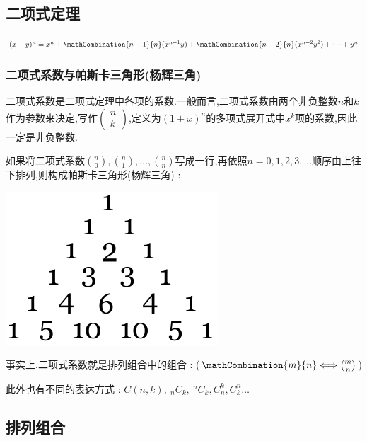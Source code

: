 {\subsection{二项式定理}{
    $(x + y)^n = x^n + \mathCombination{n - 1}{n}(x^{n-1} y) + \mathCombination{n - 2}{n}(x^{n-2} y^2) + \dots + y^n$

    \subsubsection{二项式系数与帕斯卡三角形(杨辉三角)}{

        二项式系数是二项式定理中各项的系数.一般而言,二项式系数由两个非负整数$n$和$k$作为参数来决定,写作$\begin{pmatrix}
                n \\
                k
            \end{pmatrix}$,定义为$(1 + x)^n$的多项式展开式中$x^k$项的系数,因此一定是非负整数.

        如果将二项式系数$\binom{n}{0},\binom{n}{1},\dots,\binom{n}{n}$写成一行,再依照$n = 0,1,2,3,...$顺序由上往下排列,则构成帕斯卡三角形(杨辉三角) :
        \begin{center}
            \includegraphics[scale=0.5]{resources/Pascal's_triangle_5.svg.png}
        \end{center}

        事实上,二项式系数就是排列组合中的组合 : ($\mathCombination{m}{n} \Longleftrightarrow \binom{m}{n}$)

        此外也有不同的表达方式 : $C(n,k),~_nC_k,~^nC_k,C^k_n,C^n_k\dots$

    }%

}%

\subsection{排列组合}{

}}
